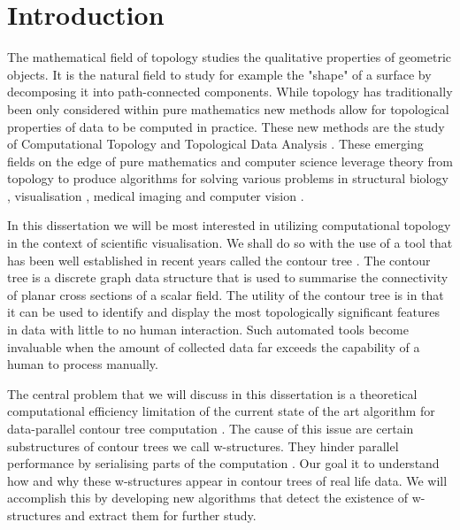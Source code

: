 \chapter{Introduction}
\label{chapter1}

The mathematical field of topology studies the qualitative properties of geometric objects. It is the natural field to study for example the "shape" of a surface by decomposing it into path-connected components. While topology has traditionally been only considered within pure mathematics new methods allow for topological properties of data to be computed in practice. These new methods are the study of Computational Topology \cite{topo-for-computing} and Topological Data Analysis \cite{topo-and-data}. These emerging fields on the edge of pure mathematics and computer science leverage theory from topology to produce algorithms for solving various problems in structural biology \cite{folded-molecules, hemo-globin}, visualisation \cite{topo-hierarchy, fiber-surfaces, flexible-isosurfaces}, medical imaging \cite{reeb-graph-brain} and
computer vision \cite{reeb-shape-analysis, structural-recognition}.

In this dissertation we will be most interested in utilizing computational topology in the context of scientific visualisation. We shall do so with the use of a tool that has been well established in recent years called the contour tree \cite{ct-big-paper}. The contour tree is a discrete graph data structure that is used to summarise the connectivity of planar cross sections of a scalar field. The utility of the contour tree is in that it can be used to identify and display the most topologically significant features in data with little to no human interaction. Such automated tools become invaluable when the amount of collected data far exceeds the capability of a human to process manually.

The central problem that we will discuss in this dissertation is a theoretical computational efficiency limitation of the current state of the art algorithm for data-parallel contour tree computation \cite{parallel-peak-pruning}. The cause of this issue are certain substructures of contour trees we call w-structures. They hinder parallel performance by serialising parts of the computation \cite{pathological-test-cases}. Our goal it to understand how and why these w-structures appear in contour trees of real life data. We will accomplish this by developing new algorithms that detect the existence of w-structures and extract them for further study.

